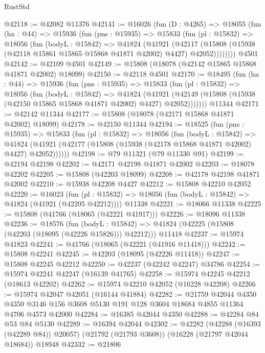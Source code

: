 \begin{lexlean}{RustStd}
\begin{coremodule}
@42118 := @42082 @11376
@42141 := @16026
    (fun (D : @4265) =>
    @18055
      (fun (hn : @44) =>
      @15936
        (fun (pns : @15935) =>
        @15833
          (fun (pl : @15832) =>
          @18056
            (fun (bodyL : @15842) =>
            @41824
              (@41921
                (@42117
                  (@15808 (@15938 (@42118 @15861 @15865 @15868 @41871 @42002) @4427) @42052))))))))
    @4501
@42142 := @42109 @4501
@42149 := @15808 (@18078 (@42142 @15865 @15868 @41871 @42002) @18099)
@42150 := @42118 @4501
@42170 := @18495
    (fun (hn : @44) =>
    @15936
      (fun (pns : @15935) =>
      @15833
        (fun (pl : @15832) =>
        @18056
          (fun (bodyL : @15842) =>
          @41824
            (@41921
              (@42149 (@15808 (@15938 (@42150 @15865 @15868 @41871 @42002) @4427) @42052)))))))
    @11344
@42171 := @42142 @11344
@42177 := @15808 (@18078 (@42171 @15868 @41871 @42002) @18099)
@42178 := @42150 @11344
@42194 := @18525
    (fun (pns : @15935) =>
    @15833
      (fun (pl : @15832) =>
      @18056
        (fun (bodyL : @15842) =>
        @41824 (@41921 (@42177 (@15808 (@15938 (@42178 @15868 @41871 @42002) @4427) @42052))))))
@42198 := @79 @11321 (@79 @11330 @91)
@42199 := @42194 @42198
@42202 := @42171 @42198 @41871 @42002
@42203 := @18078 @42202
@42205 := @15808 (@42203 @18099)
@42208 := @42178 @42198 @41871 @42002
@42210 := @15938 @42208 @4427
@42212 := @15808 @42210 @42052
@42220 := @16023
    (fun (pl : @15832) => @18056 (fun (bodyL : @15842) => @41824 (@41921 (@42205 @42212))))
    @11338
@42221 := @18066 @11338
@42225 := @15808 (@41766 (@18065 (@42221 @41917)))
@42226 := @18096 @11338
@42236 := @18576
    (fun (bodyL : @15842) => @41824 (@42225 (@15808 (@42203 (@18095 (@42226 @15826))) @42212)))
    @11418
@42237 := @15974 @41823
@42241 := @41766 (@18065 (@42221 (@41916 @11418)))
@42242 := @15808 @42241
@42245 := @42203 (@18095 (@42226 @11418))
@42247 := @15808 @42245 @42212
@42250 := @42237 (@42242 @42247) @34786
@42254 := @15974 @42241 @42247 (@16139 @41765)
@42258 := @15974 @42245 @42212 (@18613 @42202)
@42262 := @15974 @42210 @42052 (@16228 @42208)
@42266 := @15974 @42047 @42051 (@16144 @41884)
@42282 := @21759
    @42044
    @4350
    @4350
    @3146
    @156
    @3608
    @5130
    @191
    @128
    @3604
    @18684
    @4855
    @11364
    @4706
    @4573
    @42000
@42284 := @16385 @42044 @4350
@42288 := @42284 @84 @53 @84 @5130
@42289 := @16394 @42044
@42302 := @42282
    (@42288 (@16393 (@42289 @84)) @20057)
    (@21792 (@21793 @3608))
    (@16228 (@21797 @42044 @18684))
    @18948
@42332 := @21806

\end{coremodule}
\end{lexlean}
